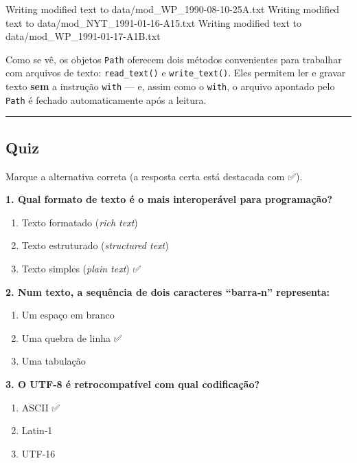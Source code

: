 \documentclass[
  brazilian,
  11pt,
]{article}
\newenvironment{Shaded}{\begin{snugshade}}{\end{snugshade}}
\newcommand{\NormalTok}[1]{\textcolor[rgb]{0.81,0.81,0.76}{#1}}
\providecommand{\tightlist}{%
  \setlength{\itemsep}{0pt}\setlength{\parskip}{0pt}}
\let\oldtexttt\texttt
\renewcommand{\texttt}[1]{{\color{inlink}\oldtexttt{#1}}}
\begin{document}
\begin{Shaded}
\begin{Highlighting}[]
\NormalTok{Writing modified text to data/mod\_WP\_1990{-}08{-}10{-}25A.txt}
\NormalTok{Writing modified text to data/mod\_NYT\_1991{-}01{-}16{-}A15.txt}
\NormalTok{Writing modified text to data/mod\_WP\_1991{-}01{-}17{-}A1B.txt}
\end{Highlighting}
\end{Shaded}

Como se vê, os objetos \texttt{Path} oferecem dois métodos convenientes
para trabalhar com arquivos de texto: \texttt{read\_text()} e
\texttt{write\_text()}. Eles permitem ler e gravar texto \textbf{sem} a
instrução \texttt{with} --- e, assim como o \texttt{with}, o arquivo
apontado pelo \texttt{Path} é fechado automaticamente após a leitura.

\begin{center}\rule{0.5\linewidth}{0.5pt}\end{center}

\subsection{Quiz}\label{quiz}

Marque a alternativa correta (a resposta certa está destacada com ✅).

\textbf{1. Qual formato de texto é o mais interoperável para
programação?}

\begin{enumerate}
\def\labelenumi{\arabic{enumi}.}
\tightlist
\item
  Texto formatado (\emph{rich text})
\item
  Texto estruturado (\emph{structured text})
\item
  Texto simples (\emph{plain text}) ✅
\end{enumerate}

\textbf{2. Num texto, a sequência de dois caracteres ``barra‑n''
representa:}

\begin{enumerate}
\def\labelenumi{\arabic{enumi}.}
\tightlist
\item
  Um espaço em branco
\item
  Uma quebra de linha ✅
\item
  Uma tabulação
\end{enumerate}

\textbf{3. O UTF‑8 é retrocompatível com qual codificação?}

\begin{enumerate}
\def\labelenumi{\arabic{enumi}.}
\tightlist
\item
  ASCII ✅
\item
  Latin‑1
\item
  UTF‑16
\end{enumerate}
\end{document}
